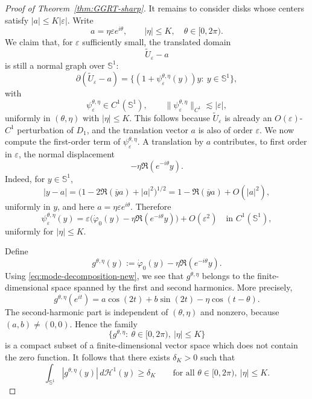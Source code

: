\documentclass[a4paper,11pt,reqno]{amsart}
\numberwithin{equation}{section}
\theoremstyle{plain} %
\theoremstyle{definition} %
\theoremstyle{remark}
\begin{document}
\begin{proof}[Proof of Theorem~\ref{thm:GGRT-sharp}]
It remains to consider disks whose centers satisfy $|a|\leq K|\varepsilon|$.
Write
\[
a=\eta \varepsilon e^{i\theta},
\qquad
|\eta|\leq K,
\quad
\theta\in [0,2\pi).
\]
We claim that, for $\varepsilon$ sufficiently small, the translated domain
\[
\widetilde U_\varepsilon-a
\]
is still a normal graph over $\mathbb S^1$:
\[
\partial(\widetilde U_\varepsilon-a)
=
\{(1+\psi_\varepsilon^{\theta,\eta}(y))y:\ y\in \mathbb S^1\},
\]
with
\[
\psi_\varepsilon^{\theta,\eta}\in C^1(\mathbb S^1),
\qquad
\|\psi_\varepsilon^{\theta,\eta}\|_{C^1}\lesssim |\varepsilon|,
\]
uniformly in $(\theta,\eta)$ with $|\eta|\leq K$. This follows because
$\widetilde U_\varepsilon$ is already an $O(\varepsilon)$-$C^1$ perturbation of
$D_1$, and the translation vector $a$ is also of order $\varepsilon$. We now compute the first-order term of $\psi_\varepsilon^{\theta,\eta}$.
A translation by $a$ contributes, to first order in $\varepsilon$, the normal
displacement
\[
-\eta \Re(e^{-i\theta}y).
\]
Indeed, for \(y\in \mathbb S^1\),
\[
|y-a|
=
\bigl(1-2\Re(\overline y a)+|a|^2\bigr)^{1/2}
=
1-\Re(\overline y a)+O(|a|^2),
\]
uniformly in \(y\), and here \(a=\eta\varepsilon e^{i\theta}\).
Therefore
\begin{equation}\label{eq:psi-expansion-new}
\psi_\varepsilon^{\theta,\eta}(y)
=
\varepsilon\Big(\dot\varphi_0(y)-\eta \Re(e^{-i\theta}y)\Big)
+
O(\varepsilon^2)
\quad \text{in } C^1(\mathbb S^1),
\end{equation}
uniformly for $|\eta|\leq K$.

Define
\[
g^{\theta,\eta}(y)
:=
\dot\varphi_0(y)-\eta \Re(e^{-i\theta}y).
\]
Using \eqref{eq:mode-decomposition-new}, we see that $g^{\theta,\eta}$ belongs
to the finite-dimensional space spanned by the first and second harmonics.
More precisely,
\[
g^{\theta,\eta}(e^{it})
=
a\cos(2t)+b\sin(2t)-\eta \cos(t-\theta).
\]
The second-harmonic part is independent of $(\theta,\eta)$ and nonzero, because
$(a,b)\neq (0,0)$. Hence the family
\[
\{g^{\theta,\eta}:\ \theta\in[0,2\pi),\ |\eta|\leq K\}
\]
is a compact subset of a finite-dimensional vector space which does not contain
the zero function. It follows that there exists $\delta_K>0$ such that
\begin{equation}\label{eq:uniform-l1-lower-new}
\int_{\mathbb S^1}|g^{\theta,\eta}(y)|\,d\mathcal H^1(y)\geq \delta_K
\qquad
\text{for all }\theta\in[0,2\pi),\ |\eta|\leq K.
\end{equation}


\end{proof}
\end{document}
